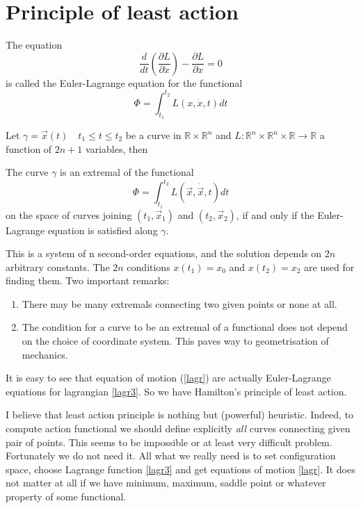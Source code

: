 \section{Principle of least action}
\label{least-action}
\begin{definition}
        The equation
        \[\frac{d}{d t}(\frac{\partial L}{\partial \dot x})-\frac{\partial L}{\partial  x}=0 \]
        is called the Euler-Lagrange equation for the functional
        \[\Phi=\int_{t_1}^{t_2} L(x,\dot x,t) dt \]
\end{definition}
Let \( \gamma= \vec x(t) \quad t_1 \le t \le t_2 \) be a curve  in  $\mathbb{R} \times \mathbb{R}^n$ and 
$L: \mathbb{R}^n \times \mathbb{R}^n \times \mathbb{R}\rightarrow \mathbb{R}$ a function of $2 n +1$
variables, then
\begin{theorem}
         The curve $\gamma$ is an extremal of the functional \[\Phi=\int_{t_1}^{t_2} L(\vec x,\dot \vec x,t) dt \]
        on the space of curves joining $(t_1, \vec x_1)$ and $(t_2,\vec x_2)$, if and only if the Euler-
Lagrange equation is satisfied along $\gamma$.
\end{theorem}
This is a system of n second-order equations, and the solution depends on
$2 n$ arbitrary constants. The $2 n$ conditions $x(t_1) = x_0$ and $x(t_2) = x_2$ are used
for finding them.
Two important remarks:
\begin{enumerate}
        \item There may be many extremals connecting two
given points or none at all.
\item The condition for a curve  to be an extremal of a functional does not depend
on the choice of coordinate system. This paves way to geometrisation of mechanics.
\end{enumerate}

It is easy to see that equation of motion (\ref{lagr}) are actually  Euler-Lagrange equations 
for lagrangian \eqref{lagr3}. 
So we have  Hamilton's principle of least action.

I believe that least action principle  is nothing but (powerful) heuristic. Indeed, to compute 
action functional we should define explicitly {\em all} curves connecting given pair of points.
This seems to be impossible or at least very difficult problem. Fortunately we do not need it.
All what we really need is to set configuration space, choose Lagrange function 
\eqref{lagr3} and get equations of motion \eqref{lagr}. It does not matter at all
if we have minimum, maximum, saddle point or whatever property of some functional.

